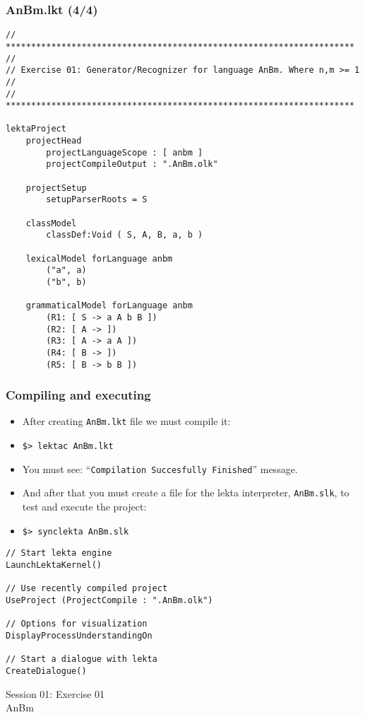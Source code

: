 \documentclass[11pt]{beamer}
\begin{document}
\begin{frame}[fragile]
\frametitle{AnBm.lkt (4/4)}
\tiny
\begin{lstlisting}[language=lekta]
// *********************************************************************
//
// Exercise 01: Generator/Recognizer for language AnBm. Where n,m >= 1
//
// *********************************************************************

lektaProject
	projectHead
		projectLanguageScope : [ anbm ]
		projectCompileOutput : ".AnBm.olk"

	projectSetup
		setupParserRoots = S

	classModel
		classDef:Void ( S, A, B, a, b )

	lexicalModel forLanguage anbm
		("a", a)
		("b", b)

	grammaticalModel forLanguage anbm
		(R1: [ S -> a A b B ])
		(R2: [ A -> ])
		(R3: [ A -> a A ])
		(R4: [ B -> ])
		(R5: [ B -> b B ])
\end{lstlisting}
\end{frame}

\begin{frame}[fragile]
\frametitle{Compiling and executing}
\begin{itemize}
	\item After creating \texttt{AnBm.lkt} file we must compile it:
	\pause
	\item \texttt{\$> lektac AnBm.lkt}
	\pause
	\item You must see: ``\texttt{Compilation Succesfully Finished}'' message.
	\pause
	\item And after that you must create a file for the lekta interpreter, \texttt{AnBm.slk}, to test and execute the project:
	\pause
	\item \texttt{\$> synclekta AnBm.slk}
\end{itemize}
\tiny
\begin{lstlisting}[language=lekta]
// Start lekta engine
LaunchLektaKernel()

// Use recently compiled project
UseProject (ProjectCompile : ".AnBm.olk")

// Options for visualization
DisplayProcessUnderstandingOn

// Start a dialogue with lekta
CreateDialogue()
\end{lstlisting}
\end{frame}

\begin{frame}[fragile]
\Huge
\begin{center}
Session 01: Exercise 01\\
AnBm
\end{center}
\end{frame}
\end{document}
